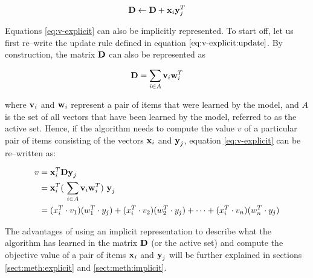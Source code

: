 \begin{equation} \label{eq:v-explicit:update}
  \boldsymbol{\mathbf{D}} \gets \boldsymbol{\mathbf{D}} + \boldsymbol{\mathbf{x}}_i \boldsymbol{\mathbf{y}}_{j}^{T}  
\end{equation}

Equations \ref{eq:v-explicit} can also be implicitly represented. To start off, let us first re--write the update rule defined in equation $\ref{eq:v-explicit:update}$. By construction, the matrix $\boldsymbol{\mathbf{D}}$ can also be represented as

\begin{equation} \label{eq:d-implicit} \nonumber
    \boldsymbol{\mathbf{D}} = \sum_{i \in A} \boldsymbol{\mathbf{v}}_i \boldsymbol{\mathbf{w}}_i^T
\end{equation}

where $\boldsymbol{\mathbf{v}}_i$ and $\boldsymbol{\mathbf{w}}_i$ represent a pair of items that were learned by the model, and $A$ is the set of all vectors that have been learned by the model, referred to as the active set. Hence, if the algorithm needs to compute the value $v$ of a particular pair of items consisting of the vectors $\boldsymbol{\mathbf{x}}_i$ and $\boldsymbol{\mathbf{y}}_j$, equation \ref{eq:v-explicit} can be re--written as:

\begin{equation} \label{eq:v-implicit}
    \begin{split}
        v &= \vect{x}_i^T \vect{D} \vect{y}_j \\
        &= \vect{x}_i^T (\ \sum_{i \in A} \vect{v}_i \vect{w}_i^T )\ \vect{y}_j \\
        &= ( x_i^T \cdot v_1 )  ( w_1^T \cdot y_j ) + ( x_i^T \cdot v_2 ) ( w_2^T  \cdot y_j ) + \cdots + ( x_i^T \cdot v_n )  ( w_n^T \cdot y_j ) \\
    \end{split}
\end{equation}

The advantages of using an implicit representation to describe what the \mlblink algorithm has learned in the matrix $\boldsymbol{\mathbf{D}}$ (or the active set) and compute the objective value of a pair of items $\boldsymbol{\mathbf{x}}_i$ and $\boldsymbol{\mathbf{y}}_j$ will be further explained in sections \ref{sect:meth:explicit} and \ref{sect:meth:implicit}.